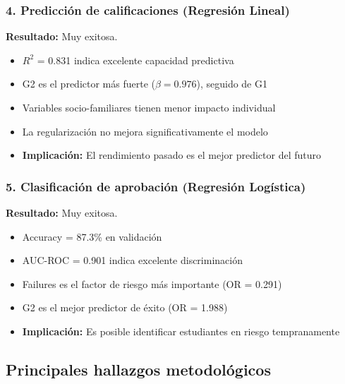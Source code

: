 \documentclass[a4paper,12pt]{article}
\begin{document}
\subsubsection{4. Predicción de calificaciones (Regresión Lineal)}
\textbf{Resultado:} Muy exitosa.
\begin{itemize}
    \item $R^2$ = 0.831 indica excelente capacidad predictiva
    \item G2 es el predictor más fuerte ($\beta = 0.976$), seguido de G1
    \item Variables socio-familiares tienen menor impacto individual
    \item La regularización no mejora significativamente el modelo
    \item \textbf{Implicación:} El rendimiento pasado es el mejor predictor del futuro
\end{itemize}

\subsubsection{5. Clasificación de aprobación (Regresión Logística)}
\textbf{Resultado:} Muy exitosa.
\begin{itemize}
    \item Accuracy = 87.3\% en validación
    \item AUC-ROC = 0.901 indica excelente discriminación
    \item Failures es el factor de riesgo más importante (OR = 0.291)
    \item G2 es el mejor predictor de éxito (OR = 1.988)
    \item \textbf{Implicación:} Es posible identificar estudiantes en riesgo tempranamente
\end{itemize}




\subsection{Principales hallazgos metodológicos}
\end{document}
